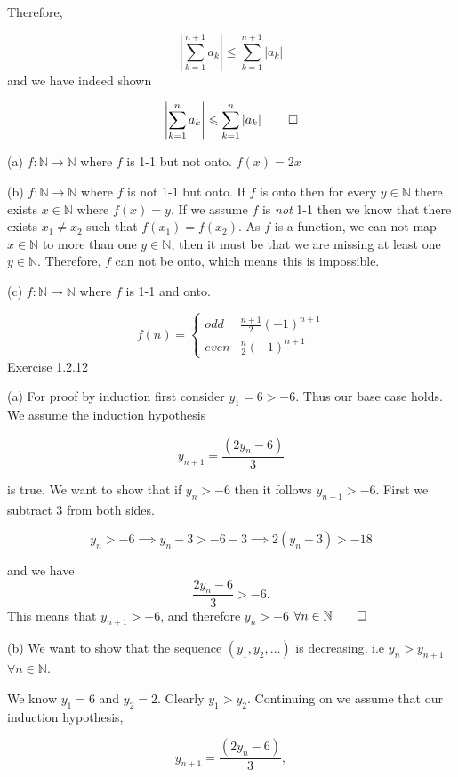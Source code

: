 \documentclass{report}
\begin{document}
Therefore,

$$
\left|\sum_{k=1}^{n+1} a_{k}\right| \leq \sum_{k=1}^{n+1}\left|a_{k}\right| $$  and we have indeed shown

$$
\left|\sum_{k=1}^{n} a_{k}\right| \leq \sum_{k=1}^{n}\left|a_{k}\right| \qed$$

\bigskip
{}
(a) $f: \mathbb{N} \rightarrow \mathbb{N}$ where $f$ is 1-1 but not onto. 
\sol  $f(x) = 2x$
\par
(b) $f: \mathbb{N} \rightarrow \mathbb{N}$ where $f$ is not 1-1 but onto. 
\sol If $f$ is onto then for every $y \in \mathbb{N}$ there exists $x \in \mathbb{N}$ where $f(x) = y$. If we assume $f$  is \textit{not} 1-1 then we know that there exists $x_1 \neq x_2$ such that $f(x_1) = f(x_2)$. As $f$ is a function, we can not map $x \in \mathbb{N}$ to more than one $y \in \mathbb{N}$, then it must be that we are missing at least one $y \in \mathbb{N}$. Therefore, $f$ can not be onto, which means this is impossible.

(c) $f: \mathbb{N} \rightarrow \mathbb{N}$ where $f$ is 1-1 and onto. 

\sol  
\[ 
 f(n) = 
  \begin{cases} 
  odd & \frac{n+1}{2} (-1)^{n+1} \\
  even & \frac{n}{2} (-1)^{n+1}
   \end{cases}
\]
\bigskip
\qs{}
{Exercise 1.2.12}

(a) \sol For proof by induction first consider $y_1 = 6 > -6$. Thus our base case holds. 
We assume the induction hypothesis

\begin{equation}
y_{n+1}  = \frac{(2y_n -6 )}{3}
\end{equation}

is true.  We want to show that if $y_n >-6$ then it follows $y_{n+1} > -6$. First we subtract 3 from both sides.

$$y_n > -6 \implies  y_n -3  > -6 -3 \implies  2(y_n -3)  > -18$$

and we have
$$
\frac{2y_n -6 }{3} > -6.
$$
This means that $y_{n+1} > -6$, and therefore $y_n > -6$ $\forall n \in \mathbb{N} \qed$
\smallskip

(b) \sol We want to show that the sequence $(y_1, y_2, \dots)$ is decreasing, i.e $ y_{n} > y_{n+1}$ $\forall n \in \mathbb{N}$.

We know $y_1 = 6$ and $y_2 = 2$. Clearly $y_1 > y_2$. Continuing on we assume that our induction hypothesis,

$$ y_{n+1}  = \frac{(2y_n -6 )}{3}, $$ 
\end{document}
